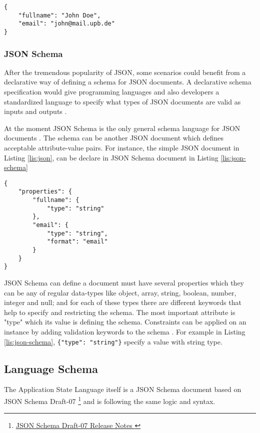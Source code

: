 \lstset{
  label=lis:json, caption=A simple JSON document., 
  basicstyle=\ttfamily\footnotesize, frame=single, captionpos=b,
  xleftmargin=.15\textwidth, xrightmargin=.15\textwidth
}
\begin{lstlisting}
{
    "fullname": "John Doe",
    "email": "john@mail.upb.de"
}
\end{lstlisting}

\subsubsection{JSON Schema}
After the tremendous popularity of JSON, some scenarios could benefit from a declarative way of defining a schema for JSON documents.
A declarative schema specification would give programming languages and also developers a standardized language to specify what types of JSON documents are valid as inputs and outputs \cite{json-schema}.

At the moment JSON Schema is the only general schema language for JSON documents \cite{json-model}.
The schema can be another JSON document which defines acceptable attribute-value pairs.
For instance, the simple JSON document in Listing \ref{lis:json}, can be declare in JSON Schema document in Listing \ref{lis:json-schema}

\lstset{
  label=lis:json-schema, caption=A simple JSON Schema document., 
  basicstyle=\ttfamily\footnotesize, frame=single, captionpos=b,
  xleftmargin=.15\textwidth, xrightmargin=.15\textwidth
}
\begin{lstlisting}
{
    "properties": {
        "fullname": {
            "type": "string"
        },
        "email": {
            "type": "string",
            "format": "email"
        }
    }
}
\end{lstlisting}

JSON Schema can define a document must have several properties which they can be any of regular data-types like object, array, string, boolean, number, integer and null; and for each of these types there are different keywords that help to specify and restricting the schema. The most important attribute is "type" which its value is defining the schema. Constraints can be applied on an instance by adding validation keywords to the schema \cite{json-model}. For example in Listing \ref{lis:json-schema}, \lstinline|{"type": "string"}| specify a value with string type.

\subsection{Language Schema}
The Application State Language itself is a JSON Schema document based on JSON Schema Draft-07
\footnote{\href{https://json-schema.org/draft-07/json-schema-release-notes.html}{JSON Schema Draft-07 Release Notes
}}
and is following the same logic and syntax. 

